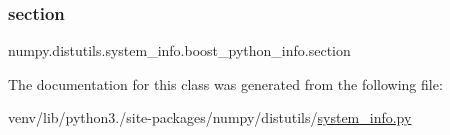 \subsubsection{\texorpdfstring{section}{section}}
{\footnotesize\ttfamily numpy.\+distutils.\+system\+\_\+info.\+boost\+\_\+python\+\_\+info.\+section\hspace{0.3cm}{\ttfamily [static]}}



The documentation for this class was generated from the following file\+:\begin{DoxyCompactItemize}
\item 
venv/lib/python3./site-\/packages/numpy/distutils/\hyperlink{system__info_8py}{system\+\_\+info.\+py}\end{DoxyCompactItemize}
